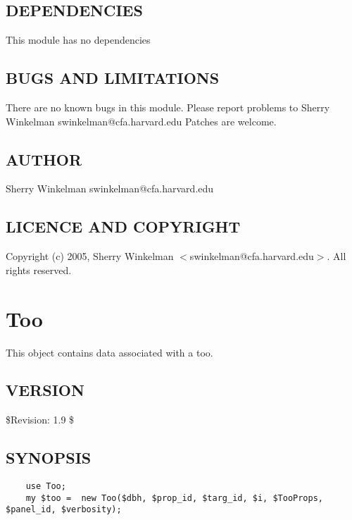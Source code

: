 \documentclass{article}
\begin{document}
\subsection*{DEPENDENCIES\label{Target_DEPENDENCIES}}


This module has no dependencies

\subsection*{BUGS AND LIMITATIONS\label{Target_BUGS_AND_LIMITATIONS}}


There are no known bugs in this module.
Please report problems to Sherry Winkelman swinkelman@cfa.harvard.edu
Patches are welcome.

\subsection*{AUTHOR\label{Target_AUTHOR}}


Sherry Winkelman swinkelman@cfa.harvard.edu

\subsection*{LICENCE AND COPYRIGHT\label{Target_LICENCE_AND_COPYRIGHT}}


Copyright (c) 2005, Sherry Winkelman $<$swinkelman@cfa.harvard.edu$>$. All rights 
reserved.

\clearpage
\section{Too\label{Too}}


This object contains data associated with a too.

\subsection*{VERSION\label{Too_VERSION}}


\$Revision: 1.9 \$

\subsection*{SYNOPSIS\label{Too_SYNOPSIS}}
\begin{verbatim}
    use Too;
    my $too =  new Too($dbh, $prop_id, $targ_id, $i, $TooProps, $panel_id, $verbosity);
\end{verbatim}
\end{document}
